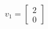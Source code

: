 \documentclass[preview]{standalone}
\begin{document}
\begin{align*}
v_1 = \begin{bmatrix} 2 \\ 0 \end{bmatrix}
\end{align*}
\end{document}
